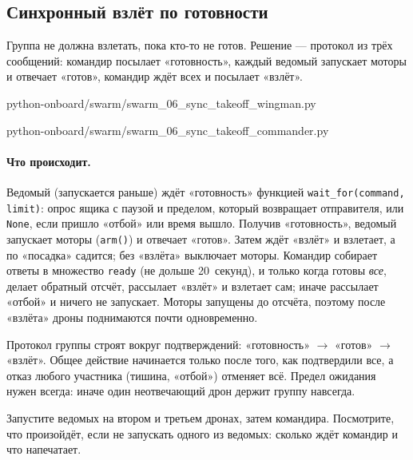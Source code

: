 \subsection{Синхронный взлёт по готовности}

Группа не должна взлетать, пока кто-то не готов. Решение --- протокол из трёх сообщений: командир посылает «готовность», каждый ведомый запускает моторы и отвечает «готов», командир ждёт всех и посылает «взлёт».

\begin{codefile}[python]{python-onboard/swarm/swarm_06_sync_takeoff_wingman.py}
\end{codefile}

\begin{codefile}[python]{python-onboard/swarm/swarm_06_sync_takeoff_commander.py}
\end{codefile}

\paragraph{Что происходит.} Ведомый (запускается раньше) ждёт «готовность» функцией \verb|wait_for(command, limit)|: опрос ящика с паузой и пределом, который возвращает отправителя, или \verb|None|, если пришло «отбой» или время вышло. Получив «готовность», ведомый запускает моторы (\verb|arm()|) и отвечает «готов». Затем ждёт «взлёт» и взлетает, а по «посадка» садится; без «взлёта» выключает моторы. Командир собирает ответы в множество \verb|ready| (не дольше 20~секунд), и только когда готовы \emph{все}, делает обратный отсчёт, рассылает «взлёт» и взлетает сам; иначе рассылает «отбой» и ничего не запускает. Моторы запущены до отсчёта, поэтому после «взлёта» дроны поднимаются почти одновременно.

\begin{rulebox}
Протокол группы строят вокруг подтверждений: «готовность» $\to$ «готов» $\to$ «взлёт». Общее действие начинается только после того, как подтвердили все, а отказ любого участника (тишина, «отбой») отменяет всё. Предел ожидания нужен всегда: иначе один неотвечающий дрон держит группу навсегда.
\end{rulebox}

\begin{taskbox}
Запустите ведомых на втором и третьем дронах, затем командира. Посмотрите, что произойдёт, если не запускать одного из ведомых: сколько ждёт командир и что напечатает.
\end{taskbox}

